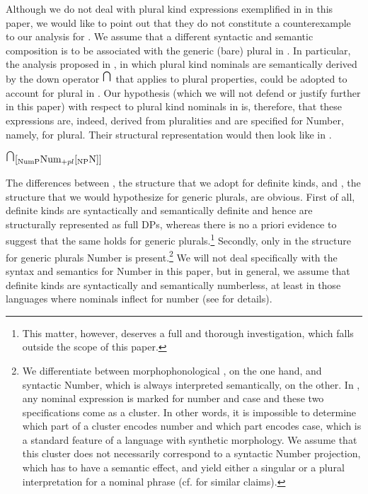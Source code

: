 \documentclass[output=paper
,modfonts
,nonflat]{langsci/langscibook}
\begin{document}
	Although we do not deal with plural kind expressions exemplified in  in this paper, we would like to point out that they do not constitute a counterexample to our analysis for . We assume that a different syntactic and semantic composition is to be associated with the generic (bare) plural in . In particular, the analysis proposed in \citep{Chierchia1998}, in which plural kind nominals are semantically derived by the down operator $^{\scriptsize{\bigcap}}$ that applies to plural properties, could be adopted to account for plural  in . Our hypothesis (which we will not defend or justify further in this paper) with respect to plural kind nominals in  is, therefore, that these expressions are, indeed, derived from pluralities and are specified for Number, namely, for plural. Their structural representation would then look like in . 
	
	\ea\label{ex:borik:4}
	$^{\scriptsize{\bigcap}} [_{\mbox{\scriptsize NumP}}  \mbox{Num}_{\scriptsize+pl} [_{\mbox{\scriptsize NP}}  \mbox{N} ]]$
	\z
	
	The differences between , the structure that we adopt for definite kinds, and , the structure that we would hypothesize for generic plurals, are obvious. First of all, definite kinds are syntactically and semantically definite and hence are structurally represented as full DPs, whereas there is no a priori evidence to suggest that the same holds for generic plurals.\footnote{This matter, however, deserves a full and thorough investigation, which falls outside the scope of this paper.}  Secondly, only in the structure for generic plurals Number is present.\footnote{We differentiate between morphophonological , on the one hand, and syntactic Number, which is always interpreted semantically, on the other. In , any nominal expression is marked for number and case and these two specifications come as a cluster. In other words, it is impossible to determine which part of a cluster encodes number and which part encodes case, which is a standard feature of a language with synthetic morphology. We assume that this cluster does not necessarily correspond to a syntactic Number projection, which has to have a semantic effect, and yield either a singular or a plural interpretation for a nominal phrase (cf. \citealt{Ionin2006,Pereltsvaig2013} for similar claims).} We will not deal specifically with the syntax and semantics for Number in this paper, but in general, we assume that definite kinds are syntactically and semantically numberless, at least in those languages where nominals inflect for number (see \citealt{Borik2015} for details).
	
\end{document}

